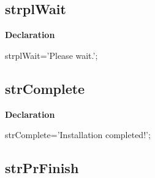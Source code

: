 \documentclass{report}
\newif\ifpdf
\begin{document}
\subsection*{strplWait}
\fi
\label{trstrings-strplWait}
\begin{list}{}{
\setlength{\itemindent}{0cm}
\setlength{\listparindent}{0cm}
\setlength{\leftmargin}{\evensidemargin}
\addtolength{\leftmargin}{\tmplength}
\settowidth{\labelsep}{X}
\addtolength{\leftmargin}{\labelsep}
\setlength{\labelwidth}{\tmplength}
}
\item[\textbf{Declaration}\hfill]
\ifpdf
\begin{flushleft}
\fi
\begin{ttfamily}
strplWait='Please wait.';\end{ttfamily}

\ifpdf
\end{flushleft}
\fi

\end{list}
\ifpdf
\subsection*{\large{\textbf{strComplete}}\normalsize\hspace{1ex}\hrulefill}
\else
\subsection*{strComplete}
\fi
\label{trstrings-strComplete}
\begin{list}{}{
\setlength{\itemindent}{0cm}
\setlength{\listparindent}{0cm}
\setlength{\leftmargin}{\evensidemargin}
\addtolength{\leftmargin}{\tmplength}
\settowidth{\labelsep}{X}
\addtolength{\leftmargin}{\labelsep}
\setlength{\labelwidth}{\tmplength}
}
\item[\textbf{Declaration}\hfill]
\ifpdf
\begin{flushleft}
\fi
\begin{ttfamily}
strComplete='Installation completed!';\end{ttfamily}

\ifpdf
\end{flushleft}
\fi

\end{list}
\ifpdf
\subsection*{\large{\textbf{strPrFinish}}\normalsize\hspace{1ex}\hrulefill}
\else
\end{document}
